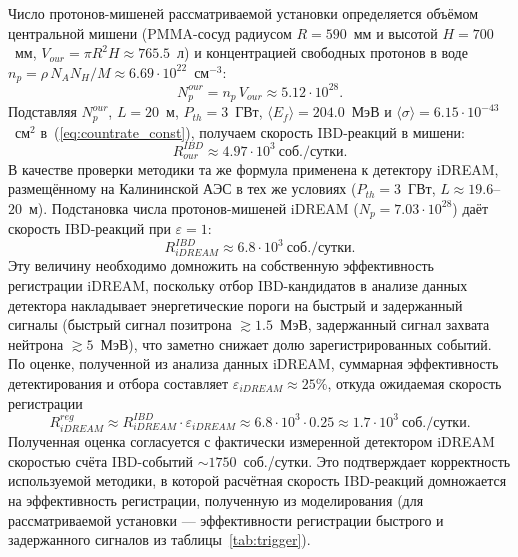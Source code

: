 \documentclass[a4paper,12pt]{extarticle}
\begin{document}
Число протонов-мишеней рассматриваемой установки определяется объёмом центральной мишени (PMMA-сосуд радиусом $R=590$~мм и высотой $H=700$~мм, $V_{our}=\pi R^2 H\approx 765.5$~л) и концентрацией свободных протонов в воде $n_p=\rho\,N_A N_H/M\approx 6.69\cdot 10^{22}$~см$^{-3}$:
\begin{equation}
    N_p^{our}=n_p\,V_{our}\approx 5.12\cdot 10^{28}.
\end{equation}
Подставляя $N_p^{our}$, $L=20$~м, $P_{th}=3$~ГВт, $\langle E_f\rangle=204.0$~МэВ и $\langle\sigma\rangle=6.15\cdot 10^{-43}$~см$^2$ в~(\ref{eq:countrate_const}), получаем скорость IBD-реакций в мишени:
\begin{equation}
    R^{IBD}_{our}\approx 4.97\cdot 10^{3}~\text{соб./сутки}.
    \label{eq:R_raw}
\end{equation}
В качестве проверки методики та же формула применена к детектору iDREAM, размещённому на Калининской АЭС в тех же условиях ($P_{th}=3$~ГВт, $L\approx 19.6$--$20$~м). Подстановка числа протонов-мишеней iDREAM ($N_p=7.03\cdot 10^{28}$) даёт скорость IBD-реакций при $\varepsilon=1$:
\begin{equation}
    R^{IBD}_{iDREAM}\approx 6.8\cdot 10^{3}~\text{соб./сутки}.
    \label{eq:R_idream_raw}
\end{equation}
Эту величину необходимо домножить на собственную эффективность регистрации iDREAM, поскольку отбор IBD-кандидатов в анализе данных детектора накладывает энергетические пороги на быстрый и задержанный сигналы (быстрый сигнал позитрона $\gtrsim 1.5$~МэВ, задержанный сигнал захвата нейтрона $\gtrsim 5$~МэВ), что заметно снижает долю зарегистрированных событий. По оценке, полученной из анализа данных iDREAM, суммарная эффективность детектирования и отбора составляет $\varepsilon_{iDREAM}\approx 25\%$, откуда ожидаемая скорость регистрации
\begin{equation}
    R^{reg}_{iDREAM}\approx R^{IBD}_{iDREAM}\cdot\varepsilon_{iDREAM}\approx 6.8\cdot 10^{3}\cdot 0.25\approx 1.7\cdot 10^{3}~\text{соб./сутки}.
    \label{eq:R_idream_reg}
\end{equation}
Полученная оценка согласуется с фактически измеренной детектором iDREAM скоростью счёта IBD-событий $\sim 1750$~соб./сутки. Это подтверждает корректность используемой методики, в которой расчётная скорость IBD-реакций домножается на эффективность регистрации, полученную из моделирования (для рассматриваемой установки --- эффективности регистрации быстрого и задержанного сигналов из таблицы~\ref{tab:trigger}).
\end{document}
